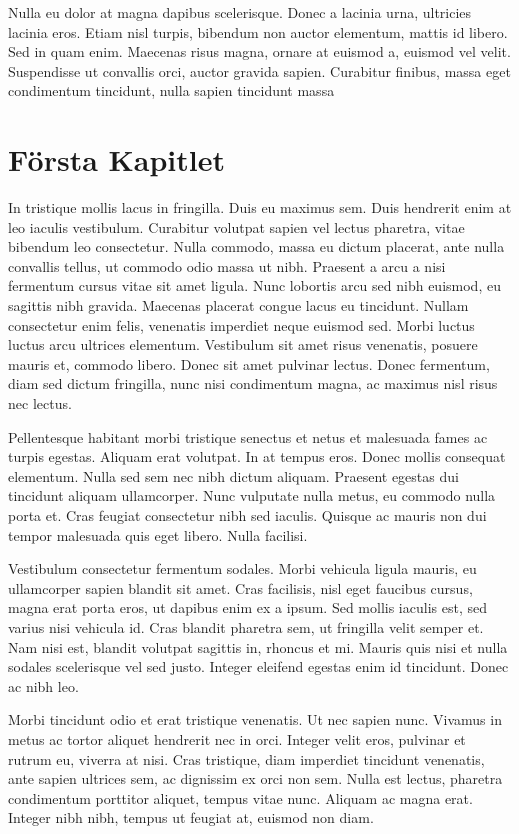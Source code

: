 \documentclass[a4paper,10pt]{article}
\begin{document}
Nulla eu dolor at magna dapibus scelerisque. Donec a lacinia urna, ultricies lacinia eros. Etiam nisl turpis, bibendum non auctor elementum, mattis id libero. Sed in quam enim. Maecenas risus magna, ornare at euismod a, euismod vel velit. Suspendisse ut convallis orci, auctor gravida sapien. Curabitur finibus, massa eget condimentum tincidunt, nulla sapien tincidunt massa

\section{Första Kapitlet}
In tristique mollis lacus in fringilla. Duis eu maximus sem. Duis hendrerit enim at leo iaculis vestibulum. Curabitur volutpat sapien vel lectus pharetra, vitae bibendum leo consectetur. Nulla commodo, massa eu dictum placerat, ante nulla convallis tellus, ut commodo odio massa ut nibh. Praesent a arcu a nisi fermentum cursus vitae sit amet ligula. Nunc lobortis arcu sed nibh euismod, eu sagittis nibh gravida. Maecenas placerat congue lacus eu tincidunt. Nullam consectetur enim felis, venenatis imperdiet neque euismod sed. Morbi luctus luctus arcu ultrices elementum. Vestibulum sit amet risus venenatis, posuere mauris et, commodo libero. Donec sit amet pulvinar lectus. Donec fermentum, diam sed dictum fringilla, nunc nisi condimentum magna, ac maximus nisl risus nec lectus.

Pellentesque habitant morbi tristique senectus et netus et malesuada fames ac turpis egestas. Aliquam erat volutpat. In at tempus eros. Donec mollis consequat elementum. Nulla sed sem nec nibh dictum aliquam. Praesent egestas dui tincidunt aliquam ullamcorper. Nunc vulputate nulla metus, eu commodo nulla porta et. Cras feugiat consectetur nibh sed iaculis. Quisque ac mauris non dui tempor malesuada quis eget libero. Nulla facilisi.

Vestibulum consectetur fermentum sodales. Morbi vehicula ligula mauris, eu ullamcorper sapien blandit sit amet. Cras facilisis, nisl eget faucibus cursus, magna erat porta eros, ut dapibus enim ex a ipsum. Sed mollis iaculis est, sed varius nisi vehicula id. Cras blandit pharetra sem, ut fringilla velit semper et. Nam nisi est, blandit volutpat sagittis in, rhoncus et mi. Mauris quis nisi et nulla sodales scelerisque vel sed justo. Integer eleifend egestas enim id tincidunt. Donec ac nibh leo.

Morbi tincidunt odio et erat tristique venenatis. Ut nec sapien nunc. Vivamus in metus ac tortor aliquet hendrerit nec in orci. Integer velit eros, pulvinar et rutrum eu, viverra at nisi. Cras tristique, diam imperdiet tincidunt venenatis, ante sapien ultrices sem, ac dignissim ex orci non sem. Nulla est lectus, pharetra condimentum porttitor aliquet, tempus vitae nunc. Aliquam ac magna erat. Integer nibh nibh, tempus ut feugiat at, euismod non diam.
\end{document}
